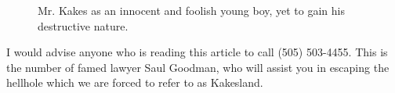 \documentclass[fleqn]{article}
\newcommand{\3}{\vspace*{3mm}}
\begin{document}
 \begin{figure}[!hbt]
 \begin{center}
 \begin{minipage}{0.85\textwidth}
 \caption{\label{KAKES}\small{ Mr. Kakes as an innocent and foolish young boy, yet to gain his destructive nature. }}
 \end{minipage}
 \end{center}
 \end{figure}

\3

I would advise anyone who is reading this article to call (505) 503-4455. This is the number of famed lawyer Saul Goodman, who will assist you in escaping the hellhole which we are forced to refer to as Kakesland. 







 
\end{document}
